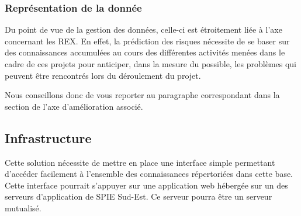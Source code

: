
\subsubsection{Représentation de la donnée}

Du point de vue de la gestion des données, celle-ci est étroitement liée à l’axe concernant les REX. En effet, la prédiction des risques nécessite de se baser sur des connaissances accumulées au cours des différentes activités menées dans le cadre de ces projets pour anticiper, dans la mesure du possible, les problèmes qui peuvent être rencontrés lors du déroulement du projet.

Nous conseillons donc de vous reporter au paragraphe correspondant dans la section de l’axe d’amélioration associé.

\subsection{Infrastructure}

Cette solution nécessite de mettre en place une interface simple permettant d’accéder facilement à l’ensemble des connaissances répertoriées dans cette base. Cette interface pourrait s’appuyer sur une application web hébergée sur un des serveurs d’application de SPIE Sud-Est. Ce serveur pourra être un serveur mutualisé.
